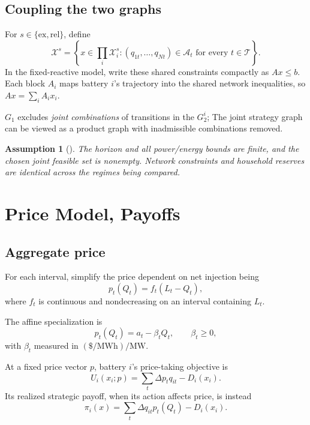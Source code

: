 \documentclass[11pt]{article}
\newtheorem{assumption}{Assumption}[section]
\theoremstyle{remark}
\newcommand{\X}{\mathcal X}
\newcommand{\T}{\mathcal T}
\begin{document}
\subsection{Coupling the two graphs}
For $s\in\{\mathrm{ex},\mathrm{rel}\}$, define
\begin{equation}
 \X^s=\left\{x\in\prod_i\X_i^s:
                   (q_{1t},\ldots,q_{Nt})\in\mathcal A_t
                   \text{ for every }t\in\T\right\}.
 \label{eq:jointset}
\end{equation}
In the fixed-reactive model, write these shared constraints compactly as
$Ax\le b$. Each block $A_i$ maps battery $i$'s trajectory into the shared
network inequalities, so $Ax=\sum_iA_ix_i$.

$G_1$ excludes \emph{joint combinations} of transitions in the $G_2^i$; The joint strategy graph can be
viewed as a product graph with inadmissible combinations removed.

\begin{assumption}[]
\label{ass:feasible}
The horizon and all power/energy bounds are finite, and the chosen joint feasible set is nonempty. 
Network constraints and household reserves are identical across the regimes being compared.
\end{assumption}

\section{Price Model, Payoffs}
\label{sec:regimes}

\subsection{Aggregate price}
For each interval, simplify the price dependent on net injection being
\begin{equation}
 p_t(Q_t)=f_t(L_t-Q_t),
 \label{eq:price}
\end{equation}
where $f_t$ is continuous and nondecreasing on an interval containing $L_t$. 

The affine specialization is
\begin{equation}
 p_t(Q_t)=a_t-\beta_tQ_t,\qquad\beta_t\ge0,
 \label{eq:affine}
\end{equation}
with $\beta_t$ measured in $(\$/\mathrm{MWh})/\mathrm{MW}$.

At a fixed price vector $p$, battery $i$'s price-taking objective is
\begin{equation}
 U_i(x_i;p)=\sum_t\Delta p_tq_{it}-D_i(x_i).
 \label{eq:fixedpayoff}
\end{equation}
Its realized strategic payoff, when its action affects price, is instead
\begin{equation}
 \pi_i(x)=\sum_t\Delta q_{it}p_t(Q_t)-D_i(x_i).
 \label{eq:strategicpayoff}
\end{equation}
\end{document}
